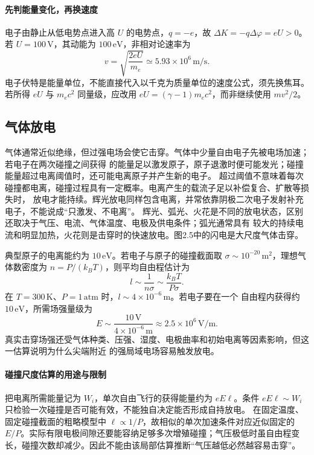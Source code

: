 \acceleratorTunnelFigure
{}


\paragraph{先判能量变化，再换速度}
电子由静止从低电势点进入高 $U$ 的电势点，$q=-e$，故
$\Delta K=-q\Delta\varphi=eU>0$。若 $U=100\,\mathrm V$，其动能为 $100\,\mathrm{eV}$，非相对论速率为
\[
 v=\sqrt{\frac{2eU}{m_e}}\simeq5.93\times10^6\,\mathrm{m/s}.
\]
电子伏特是能量单位，不能直接代入以千克为质量单位的速度公式，须先换焦耳。若所得 $eU$ 与 $m_ec^2$ 同量级，应改用 $eU=(\gamma-1)m_ec^2$，而非继续使用 $mv^2/2$。

\subsection*{气体放电}

气体通常近似绝缘，但过强电场会使它击穿。气体中少量自由电子先被电场加速；若电子在两次碰撞之间获得
的能量足以激发原子，原子退激时便可能发光；碰撞能量超过电离阈值时，还可能电离原子并产生新的电子。
超过阈值不意味着每次碰撞都电离，碰撞过程具有一定概率。电离产生的载流子足以补偿复合、扩散等损失时，
放电才能持续。辉光放电同样包含电离，并常依靠阴极二次电子发射补充电子，不能说成“只激发、不电离”。
辉光、弧光、火花是不同的放电状态，区别还取决于气压、电流、气体温度、电极及供电条件；弧光通常具有
较大的持续电流和明显加热，火花则是击穿时的快速放电。图2.5中的闪电是大尺度气体击穿。

\lightningFigure
{}

典型原子的电离能约为 $10\,\mathrm{eV}$。若电子与原子的碰撞截面取
$\sigma\sim10^{-20}\,\mathrm{m^2}$，理想气体数密度为 $n=P/(k_BT)$，则平均自由程估计为
\[
  l\sim\frac1{n\sigma}\sim\frac{k_BT}{P\sigma}.
\]
在 $T=300\,\mathrm K$、$P=1\,\mathrm{atm}$ 时，$l\sim4\times10^{-6}\,\mathrm m$。若电子要在一个
自由程内获得约 $10\,\mathrm{eV}$，所需场强量级为
\[
  E\sim\frac{10\,\mathrm V}{4\times10^{-6}\,\mathrm m}
  \approx2.5\times10^6\,\mathrm{V/m}.
\]
真实击穿场强还受气体种类、压强、湿度、电极曲率和初始电离等因素影响，但这一估算说明为什么尖端附近
的强局域电场容易触发放电。


\paragraph{碰撞尺度估算的用途与限制}
把电离所需能量记为 $W_i$，单次自由飞行的获得能量约为 $eE\ell$。条件 $eE\ell\sim W_i$ 只检验一次碰撞是否可能有效，不能独自决定能否形成自持放电。
在固定温度、固定碰撞截面的粗略模型中 $\ell\propto1/P$，故相似的单次加速条件对应近似固定的 $E/P$。实际有限电极间隙还要能容纳足够多次增殖碰撞；气压极低时虽自由程变长，碰撞次数却减少。因此不能由该局部估算推断“气压越低必然越容易击穿”。

